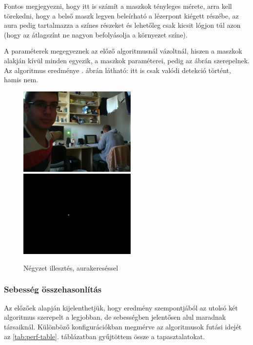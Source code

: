 \documentclass[a4paper,oneside]{article}
\begin{document}
Fontos megjegyezni, hogy itt is számít a maszkok tényleges mérete, arra kell törekedni, hogy a belső maszk legyen beleírható a lézerpont kiégett részébe, az aura pedig tartalmazza a színes részeket és lehetőleg csak kicsit lógjon túl azon (hogy az átlagszínt ne nagyon befolyásolja a környezet színe).

A paraméterek megegyeznek az előző algoritmusnál vázoltnál, hiszen a maszkok alakján kívül minden egyezik, a maszkok paraméterei, pedig az ábrán szerepelnek. Az algoritmus eredménye . ábrán látható: itt is csak valódi detekció történt, hamis nem.

\begin{figure}[tbh]
  \centering
  \includegraphics[width=165pt]{figs/laser.png} \hspace{5pt}  \includegraphics[width=165pt]{figs/laser4-b.png}
  \caption{Négyzet illesztés, aurakereséssel \label{fig:laser4}}
\end{figure}

\subsubsection{Sebesség összehasonlítás}

Az előzőek alapján kijelenthetjük, hogy eredmény szempontjából az utolsó két algoritmus szerepelt a legjobban, de sebességben jelentősen alul maradnak társaiknál. Különböző konfigurációkban megmérve az algoritmusok futási idejét az \ref{tab:perf-table}. táblázatban gyűjtöttem össze a tapasztalatokat.
\end{document}

